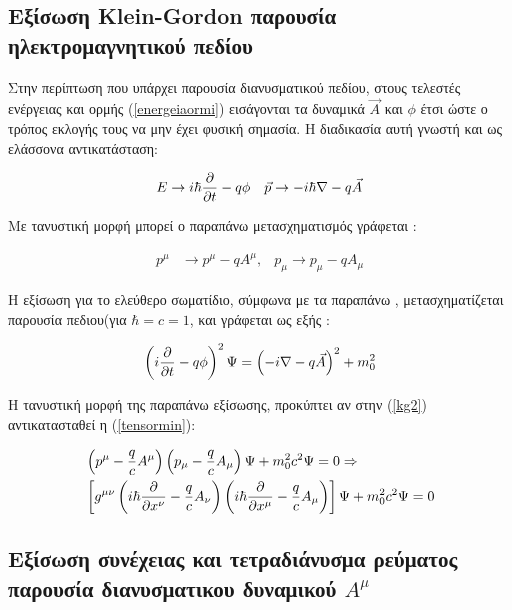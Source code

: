 \subsection{Εξίσωση \textlatin{Klein-Gordon} παρουσία ηλεκτρομαγνητικού πεδίου}

Στην περίπτωση που υπάρχει παρουσία διανυσματικού πεδίου, στους τελεστές ενέργειας και ορμής (\ref{energeiaormi}) εισάγονται τα δυναμικά $\vec{A}$ και $\phi$ έτσι ώστε ο τρόπος εκλογής τους να μην έχει φυσική σημασία. Η διαδικασία αυτή γνωστή και ως ελάσσονα αντικατάσταση: 

\begin{align} 
  E & \rightarrow i\hbar \frac{\partial }{\partial t} -q\phi  &\vec{p} \rightarrow -i \hbar \nabla-q\vec{A}
  \label{energeiaormi2}
\end{align} 

Με τανυστική μορφή μπορεί ο παραπάνω μετασχηματισμός γράφεται : 

\begin{align}
  p^\mu & \rightarrow p^\mu-qA^\mu,    &p_\mu \rightarrow p_\mu-qA_\mu
  \label{tensormin}
\end{align}

Η εξίσωση για το ελεύθερο σωματίδιο, σύμφωνα με τα παραπάνω , μετασχηματίζεται παρουσία πεδιου(για $\hbar=c=1$, και γράφεται ως εξής : 

\[
\left(  i \frac{\partial }{\partial t}-q\phi \right)  ^2 \Psi = \left(  -i \nabla -q\vec{A} \right)  ^2 +m_0^2 
\label{kgfield} 
\]

Η τανυστική μορφή της παραπάνω εξίσωσης, προκύπτει αν στην (\ref{kg2}) αντικατασταθεί η (\ref{tensormin}): 

\begin{align}
  \notag &\left(  p^\mu-\frac{q}{c}A^\mu \right)  \left(  {p}_\mu-\frac{q}{c}A_\mu \right)  \Psi +m_0^2 c^2 \Psi = 0 \Rightarrow
  \\  &\left[  g^{\mu\nu} \left(  i \hbar\frac{\partial }{\partial x^\nu}-\frac{q}{c}A_\nu \right)  \left(  i \hbar\frac{\partial }{\partial x^\mu}-\frac{q}{c}A_\mu \right) \right]  \Psi+m_0^2 c^2 \Psi  =0 
  \label{eqn1}
\end{align}

\subsection{Εξίσωση συνέχειας και τετραδιάνυσμα ρεύματος παρουσία διανυσματικου δυναμικού $A^\mu$}  

